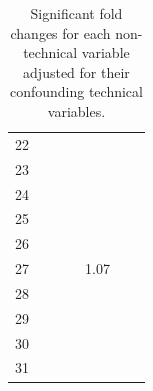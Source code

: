 \documentclass[a4paper, 11pt]{article}
\begin{document}
\begin{multicols}{2}
\begin{table}[t]
{\begin{tabular}{|c |c |c |c| c | c| c|}
22 &  &  &  &  &  \\
23 &  &  & &  &  \\
24 &  &  &  &  &  \\
25 &  &  & &  &\\
26 &  &  &  &  &   \\
27 &  &  &  &  \cellcolor[HTML]{FDFF89}1.07 &  \\
28 &  &  &  &  & \\
29 &  &  &  &  & \\
30 &  &  &  &  &  \\
31 &  &  &  &  &  \\
\hline
\end{tabular}}
\caption{Significant fold changes for each non-technical variable adjusted for their confounding technical variables.}
\label{tab:Q2FC}
\end{table}






\end{multicols}
\end{document}
